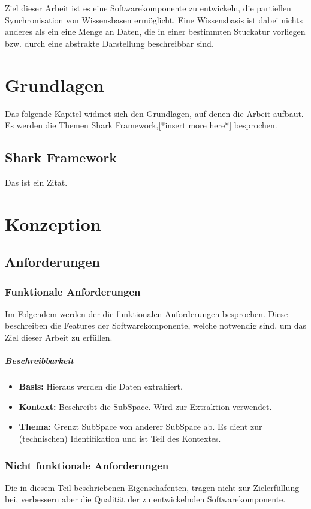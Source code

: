 \documentclass[a4paper]{article}
\begin{document}
	Ziel dieser Arbeit ist es eine Softwarekomponente zu entwickeln, die 
	partiellen Synchronisation von Wissensbasen ermöglicht. Eine Wissensbasis
	ist dabei nichts anderes als ein eine Menge an Daten, die in einer
	bestimmten Stuckatur vorliegen bzw. durch eine abstrakte Darstellung
	beschreibbar sind. 
	
	\section{Grundlagen}	
	
	Das folgende Kapitel widmet sich den Grundlagen, auf denen die Arbeit
	aufbaut. Es werden die Themen Shark Framework,[*insert more here*]
	besprochen.
	
	\subsection{Shark Framework}
	
	Das ist ein Zitat. \cite{SharkFW}
	
	
	\section{Konzeption}	
	
	\subsection{Anforderungen}
	
	\subsubsection{Funktionale Anforderungen}
	
	Im Folgendem werden der die funktionalen Anforderungen besprochen. Diese
	beschreiben die Features der Softwarekomponente, welche notwendig sind,
	um das Ziel dieser Arbeit zu erfüllen.
	
	\subparagraph{Beschreibbarkeit}
	
	\begin{itemize}
		\item \textbf{Basis:} Hieraus werden die Daten extrahiert.
		\item \textbf{Kontext:} Beschreibt die SubSpace. Wird zur Extraktion
			  verwendet.
		\item \textbf{Thema:} Grenzt SubSpace von anderer SubSpace ab. Es dient 				  zur (technischen) Identifikation und ist Teil des Kontextes.
	\end{itemize} 	
	
	\subsubsection{Nicht funktionale Anforderungen}
	
	Die in diesem Teil beschriebenen Eigenschafenten, tragen nicht zur
	Zielerfüllung bei, verbessern aber die Qualität der zu entwickelnden
	Softwarekomponente.
	
	\newpage
	\printbibliography
	\newpage
	\listoffigures
	\newpage
	\listoftables
\end{document}
